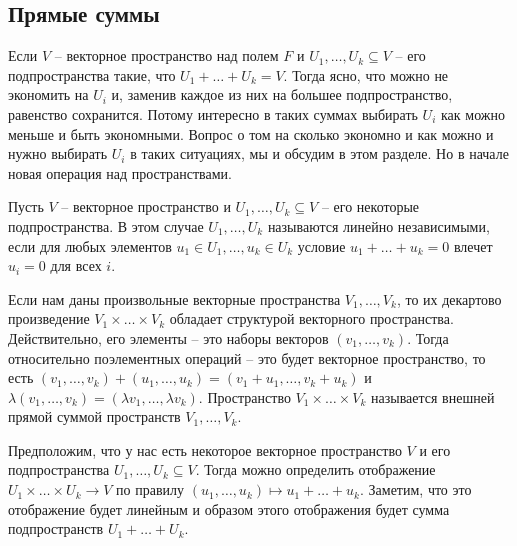 \subsection{Прямые суммы}

Если $V$ -- векторное пространство над полем $F$ и $U_1,\ldots,U_k\subseteq V$ -- его подпространства такие, что $U_1 + \ldots + U_k = V$.
Тогда ясно, что можно не экономить на $U_i$ и, заменив каждое из них на большее подпространство, равенство сохранится.
Потому интересно в таких суммах выбирать $U_i$ как можно меньше и быть экономными.
Вопрос о том на сколько экономно и как можно и нужно выбирать $U_i$ в таких ситуациях, мы и обсудим в этом разделе.
Но в начале новая операция над пространствами.

\begin{definition}
\label{def::IndepSpaces}
Пусть $V$ -- векторное пространство и $U_1,\ldots,U_k\subseteq V$ -- его некоторые подпространства.
В этом случае $U_1,\ldots, U_k$ называются линейно независимыми, если для любых элементов $u_1\in U_1, \ldots, u_k\in U_k$ условие $u_1 + \ldots + u_k = 0$ влечет $u_i = 0$ для всех $i$.
\end{definition}

\begin{definition}
Если нам даны произвольные векторные пространства $V_1,\ldots, V_k$, то их декартово произведение $V_1\times\ldots\times V_k$ обладает структурой векторного пространства.
Действительно, его элементы -- это наборы векторов $(v_1,\ldots,v_k)$.
Тогда относительно поэлементных операций -- это будет векторное пространство, то есть
$(v_1,\ldots,v_k) + (u_1,\ldots,u_k) = (v_1 + u_1,\ldots,v_k + u_k)$ и $\lambda(v_1,\ldots,v_k) = (\lambda v_1, \ldots, \lambda v_k)$.
Пространство $V_1\times\ldots \times V_k$ называется внешней прямой суммой пространств $V_1,\ldots, V_k$.
\end{definition}

Предположим, что у нас есть некоторое векторное пространство $V$ и его подпространства $U_1,\ldots,U_k\subseteq V$.
Тогда можно определить отображение $U_1\times \ldots \times U_k \to V$ по правилу $(u_1,\ldots,u_k) \mapsto u_1 + \ldots + u_k$.
Заметим, что это отображение будет линейным и образом этого отображения будет сумма подпространств $U_1 + \ldots + U_k$.

